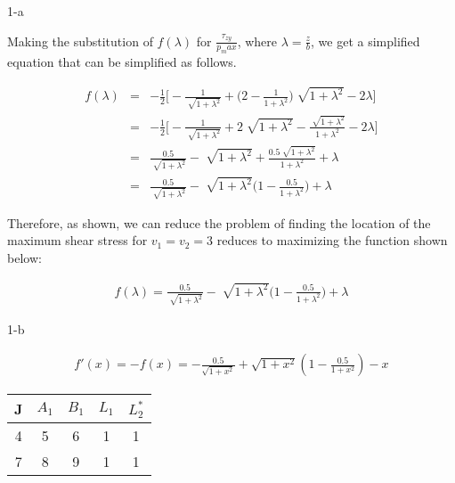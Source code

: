 \documentclass[11pt]{article}
\begin{document}
\begin{prob}{1-a}
\end{prob}
\begin{sol} 

Making the substitution of $f(\lambda)$ for $\frac{\tau_{zy}}{p_max}$, where $\lambda = \frac{z}{b}$, we get a simplified equation that can be simplified as follows.

\begin{eqnarray*}
f(\lambda) & = & -\frac{1}{2}\Bigg[ -\frac{1}{\sqrt[]{1 + \lambda^2}} +  \Bigg(2 - \frac{1}{1 + \lambda^2}\Bigg) \sqrt[]{1 + \lambda^2} -2\lambda \Bigg] \\
& = & -\frac{1}{2}\Bigg[ -\frac{1}{\sqrt[]{1 + \lambda^2}} +  2\sqrt[]{1 + \lambda^2} - \frac{\sqrt[]{1 + \lambda^2}}{1 + \lambda^2} -2\lambda \Bigg] \\
& = & \frac{0.5}{\sqrt[]{1 + \lambda^2}} - \sqrt[]{1 + \lambda^2} + \frac{0.5\sqrt[]{1 + \lambda^2}}{1 + \lambda^2} + \lambda \\
& = & \frac{0.5}{\sqrt[]{1 + \lambda^2}} - \sqrt[]{1 + \lambda^2}\Bigg(1 - \frac{0.5}{1 + \lambda^2}\Bigg) + \lambda
\end{eqnarray*}

Therefore, as shown, we can reduce the problem of finding the location of the maximum shear stress for $v_{1} = v_{2} = 3$ reduces to maximizing the function shown below:

\begin{eqnarray*}
f(\lambda) = \frac{0.5}{\sqrt[]{1 + \lambda^2}} - \sqrt[]{1 + \lambda^2}\Bigg(1 - \frac{0.5}{1 + \lambda^2}\Bigg) + \lambda
\end{eqnarray*}

\end{sol}

\begin{prob}{1-b}
\end{prob}
\begin{sol} 

\begin{eqnarray*}
f'(x) = -f(x) =-\frac{0.5}{\sqrt{1+x^2}}+\sqrt{1+x^2} \left(1-\frac{0.5}{1+x^2}\right)-x 
\end{eqnarray*}


\begin{center}
  \begin{tabular}{| c | c | c | c | c |}
    \hline
    J & $A_{1}$ & $B_{1}$ & \textbf{$L_{1}$} & \textbf{$L_{2}^{*}$} \\ \hline
    4 & 5 & 6 & 1 & 1\\ \hline
    7 & 8 & 9 & 1 & 1\\
    \hline
  \end{tabular}
\end{center}

\end{sol}
\end{document}
